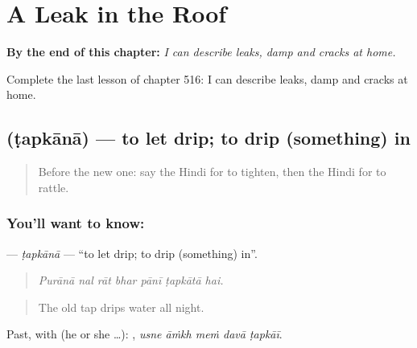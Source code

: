 
\chapter{A Leak in the Roof}
\label{ch:hi-a-leak-in-the-roof}

\begin{chapteropening}
\textbf{By the end of this chapter:} \emph{I can describe leaks, damp and cracks at home.}

Complete the last lesson of chapter 516: I can describe leaks, damp and cracks at home.
\end{chapteropening}

\section[\texorpdfstring{\hi{टपकाना} (ṭapkānā)}{टपकाना (ṭapkānā)}]{ (ṭapkānā) — to let drip; to drip (something) in}

\label{lesson:HI-C516-tapkana}



\begin{quote}
Before the new one: say the Hindi for to tighten, then the Hindi for to rattle.
\end{quote}

\subsection*{You'll want to know: }
\textbf{} — \emph{ṭapkānā} — \textquotedblleft{}to let drip; to drip (something) in\textquotedblright{}.

\begin{quote}
      
\end{quote}

\begin{quote}
\emph{Purānā nal rāt bhar pānī ṭapkātā hai.}
\end{quote}

\begin{quote}
The old tap drips water all night.
\end{quote}

Past, with  (he or she …):     , \emph{usne āṁkh meṁ davā ṭapkāī}.

